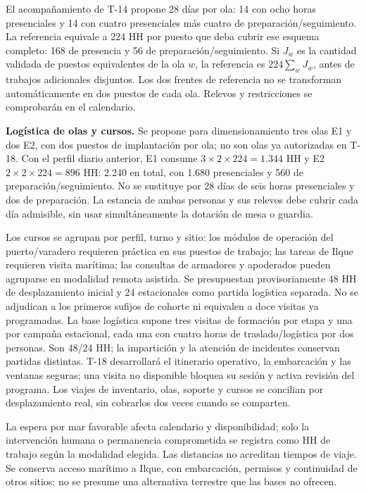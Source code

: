 El acompañamiento de T-14 propone 28 días por ola: 14 con ocho horas presenciales y 14 con cuatro presenciales más cuatro de preparación/seguimiento. La referencia equivale a 224 HH por puesto que deba cubrir ese esquema completo: 168 de presencia y 56 de preparación/seguimiento. Si $J_w$ es la cantidad validada de puestos equivalentes de la ola $w$, la referencia es $224\sum_w J_w$, antes de trabajos adicionales disjuntos. Los dos frentes de referencia no se transforman automáticamente en dos puestos de cada ola. Relevos y restricciones se comprobarán en el calendario.


\textbf{Logística de olas y cursos.} Se propone para dimensionamiento tres olas E1 y dos E2, con dos puestos de implantación por ola; no son olas ya autorizadas en T-18. Con el perfil diario anterior, E1 consume $3\times2\times224=1.344$ HH y E2 $2\times2\times224=896$ HH: 2.240 en total, con 1.680 presenciales y 560 de preparación/seguimiento. No se sustituye por 28 días de seis horas presenciales y dos de preparación. La estancia de ambas personas y sus relevos debe cubrir cada día admisible, sin usar simultáneamente la dotación de mesa o guardia.

Los cursos se agrupan por perfil, turno y sitio: los módulos de operación del puerto/varadero requieren práctica en sus puestos de trabajo; las tareas de Ilque requieren visita marítima; las consultas de armadores y apoderados pueden agruparse en modalidad remota asistida. Se presupuestan provisoriamente 48 HH de desplazamiento inicial y 24 estacionales como partida logística separada. No se adjudican a los primeros sufijos de cohorte ni equivalen a doce visitas ya programadas. La base logística supone tres visitas de formación por etapa y una por campaña estacional, cada una con cuatro horas de traslado/logística por dos personas. Son 48/24 HH; la impartición y la atención de incidentes conservan partidas distintas. T-18 desarrollará el itinerario operativo, la embarcación y las ventanas seguras; una visita no disponible bloquea su sesión y activa revisión del programa. Los viajes de inventario, olas, soporte y cursos se concilian por desplazamiento real, sin cobrarlos dos veces cuando se comparten.

La espera por mar favorable afecta calendario y disponibilidad; solo la intervención humana o permanencia comprometida se registra como HH de trabajo según la modalidad elegida. Las distancias no acreditan tiempos de viaje. Se conserva acceso marítimo a Ilque, con embarcación, permisos y continuidad de otros sitios; no se presume una alternativa terrestre que las bases no ofrecen.

